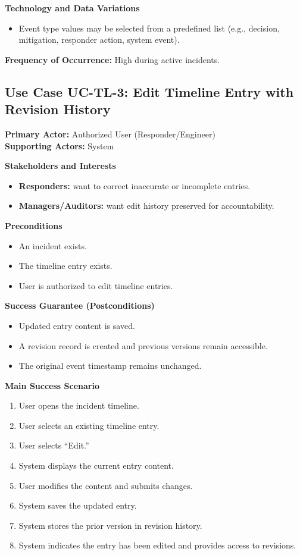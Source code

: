 \documentclass[11pt]{article}
\begin{document}
\textbf{Technology and Data Variations}
\begin{itemize}[nosep]
  \item Event type values may be selected from a predefined list (e.g., decision, mitigation, responder action, system event).
\end{itemize}

\textbf{Frequency of Occurrence:} High during active incidents.

\subsection*{Use Case UC-TL-3: Edit Timeline Entry with Revision History}
\textbf{Primary Actor:} Authorized User (Responder/Engineer) \\
\textbf{Supporting Actors:} System

\textbf{Stakeholders and Interests}
\begin{itemize}[nosep]
  \item \textbf{Responders:} want to correct inaccurate or incomplete entries.
  \item \textbf{Managers/Auditors:} want edit history preserved for accountability.
\end{itemize}

\textbf{Preconditions}
\begin{itemize}[nosep]
  \item An incident exists.
  \item The timeline entry exists.
  \item User is authorized to edit timeline entries.
\end{itemize}

\textbf{Success Guarantee (Postconditions)}
\begin{itemize}[nosep]
  \item Updated entry content is saved.
  \item A revision record is created and previous versions remain accessible.
  \item The original event timestamp remains unchanged.
\end{itemize}

\textbf{Main Success Scenario}
\begin{enumerate}[nosep]
  \item User opens the incident timeline.
  \item User selects an existing timeline entry.
  \item User selects ``Edit.''
  \item System displays the current entry content.
  \item User modifies the content and submits changes.
  \item System saves the updated entry.
  \item System stores the prior version in revision history.
  \item System indicates the entry has been edited and provides access to revisions.
\end{enumerate}
\end{document}
